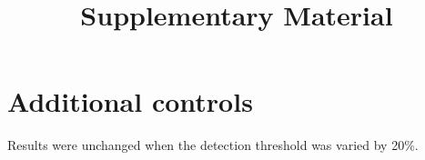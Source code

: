 \documentclass[11pt]{article}
\title{Supplementary Material}
\date{}
\begin{document}
\maketitle

\section{Additional controls}

Results were unchanged when the detection threshold was varied by 20\%.
\end{document}
